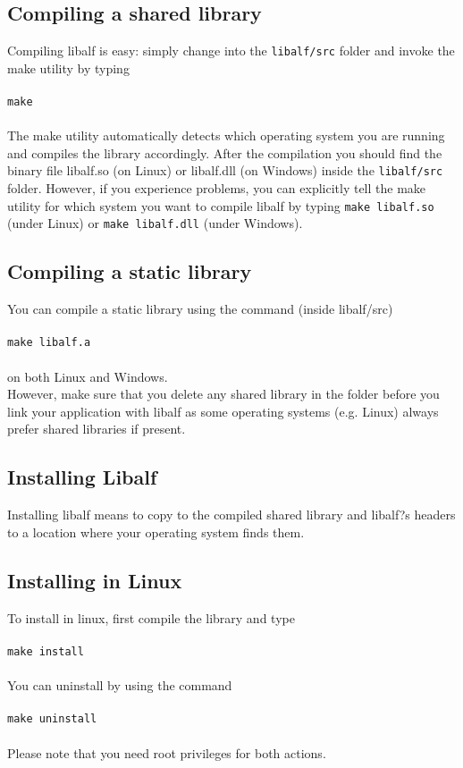 \subsection*{Compiling a shared library}
Compiling libalf is easy: simply change into the \texttt{libalf/src} folder and invoke the make utility by typing 
\\ \\
\texttt{make}
\\ \\
The make utility automatically detects which operating system you are running and compiles the library accordingly. After the compilation you should find the binary file libalf.so (on Linux) or libalf.dll (on Windows) inside the \texttt{libalf/src} folder.
However, if you experience problems, you can explicitly tell the make utility for which system you want to compile libalf by typing \texttt{make libalf.so} (under Linux) or \texttt{make libalf.dll} (under Windows).

\subsection*{Compiling a static library}
You can compile a static library using the command (inside libalf/src)
\\ \\
\texttt{make libalf.a}
\\ \\
on both Linux and Windows. \\ However, make sure that you delete any shared library in the folder before you link your application with libalf as some operating systems (e.g. Linux) always prefer shared libraries if present.

\subsection{Installing Libalf}
Installing libalf means to copy to the compiled shared library and libalf?s headers to a location where your operating system finds them.
\subsection*{Installing in Linux}
To install \libalf in linux, first compile the library and type
\\ \\
\texttt{make install}
\\ \\
You can uninstall \libalf by using the command
\\ \\
\texttt{make uninstall}
\\ \\
Please note that you need root privileges for both actions.
